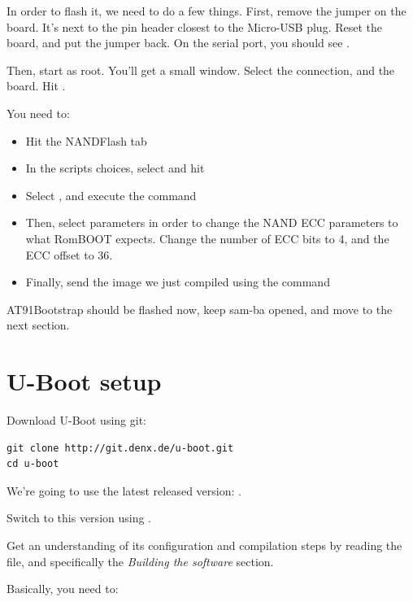 In order to flash it, we need to do a few things. First, remove the
 jumper on the board. It's next to the pin header
closest to the Micro-USB plug. Reset the board, and put the jumper
back. On the serial port, you should see .

Then, start  as root. You'll get a small window. Select
the  connection, and the  board. Hit
.

You need to:
\begin{itemize}
\item Hit the NANDFlash tab
\item In the scripts choices, select  and hit 
\item Select , and execute the command
\item Then, select  parameters in order to
  change the NAND ECC parameters to what RomBOOT expects. Change the
  number of ECC bits to 4, and the ECC offset to 36.
\item Finally, send the image we just compiled using the command
\end{itemize}

AT91Bootstrap should be flashed now, keep sam-ba opened, and move to
the next section.

\section{U-Boot setup}

Download U-Boot using git:

\begin{verbatim}
git clone http://git.denx.de/u-boot.git
cd u-boot
\end{verbatim}

We're going to use the latest released version: .

Switch to this version using .

Get an understanding of its configuration and compilation steps by
reading the  file, and specifically the {\em Building the
  software} section.

Basically, you need to:

